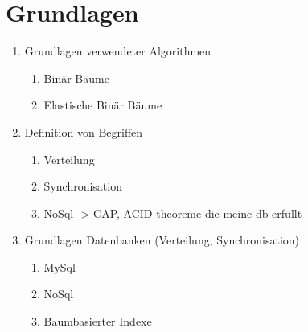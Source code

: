 \documentclass[a4paper,11pt,oneside,%
headsepline,												%
footsepline,												%
bibtotocnumbered									%
]{scrreprt}
\begin{document}
\chapter{Grundlagen}

	\begin{enumerate}[1.]
			\item Grundlagen verwendeter Algorithmen
				\begin{enumerate}[1.]
					\item Binär Bäume
					\item Elastische Binär Bäume
				\end{enumerate}
			\item Definition von Begriffen
				\begin{enumerate}[1.]
					\item Verteilung
					\item Synchronisation
					\item NoSql -> CAP, ACID theoreme die meine db erfüllt 
				\end{enumerate}
			\item Grundlagen Datenbanken (Verteilung, Synchronisation)
				\begin{enumerate}[1.]
					\item MySql
					\item NoSql 
					\item Baumbasierter Indexe
				\end{enumerate}
	\end{enumerate}
\end{document}
